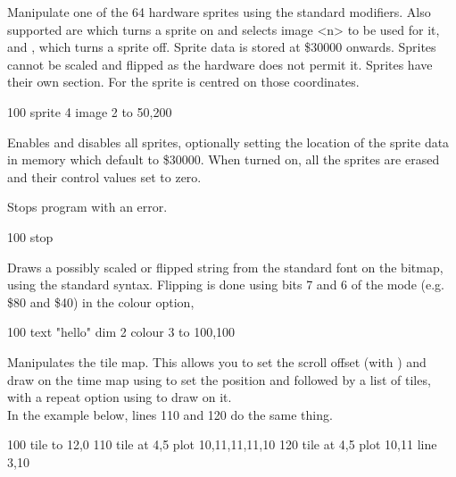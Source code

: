 \begin{entry}
Manipulate one of the 64 hardware sprites using the standard modifiers. Also supported are  which turns a sprite on and selects image <n> to be used for it, and , which turns a sprite off. Sprite data is stored at \$30000 onwards. Sprites cannot be scaled and flipped as the hardware does not permit it. Sprites have their own section. For  the sprite is centred on those coordinates.

\begin{lstexample}
100 sprite 4 image 2 to 50,200
\end{lstexample}
\end{entry}

\begin{entry}
Enables and disables all sprites, optionally setting the location of the sprite data in memory which default to \$30000. When turned on, all the sprites are erased and their control values set to zero.

\end{entry}

\begin{entry}
Stops program with an error.

\begin{lstexample}
100 stop
\end{lstexample}
\end{entry}

\begin{entry}
Draws a possibly scaled or flipped string from the standard font on the bitmap, using the standard syntax. Flipping is done using bits 7 and 6 of the mode (e.g. \$80 and \$40) in the colour option,

\begin{lstexample}
100 text "hello" dim 2 colour 3 to 100,100
\end{lstexample}
\end{entry}

\begin{entry}
Manipulates the tile map. This allows you to set the scroll offset (with ) and draw on the time map using  to set the position and  followed by a list of tiles, with a repeat option using  to draw on it.\\

In the example below, lines 110 and 120 do the same thing.

\begin{lstexample}
100 tile to 12,0
110 tile at 4,5 plot 10,11,11,11,10
120 tile at 4,5 plot 10,11 line 3,10
\end{lstexample}
\end{entry}

